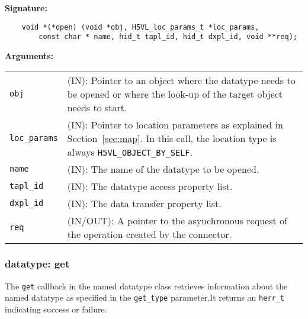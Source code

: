 \begin{mdframed}[style=bgbox]
\textbf{Signature:}
\begin{lstlisting}
    void *(*open) (void *obj, H5VL_loc_params_t *loc_params, 
        const char * name, hid_t tapl_id, hid_t dxpl_id, void **req);
\end{lstlisting}

\textbf{Arguments:}\\
\begin{tabular}{l p{13.5cm}}
  \texttt{obj} & (IN): Pointer to an object where the datatype needs
  to be opened or where the look-up of the target object needs to
  start.\\
  \texttt{loc\_params} & (IN): Pointer to location parameters as explained in
  Section~\ref{sec:map}. In this call, the location type is always \texttt{H5VL\_OBJECT\_BY\_SELF}. \\
  \texttt{name} & (IN): The name of the datatype to be opened.\\
  \texttt{tapl\_id} & (IN): The datatype access property list.\\
  \texttt{dxpl\_id} & (IN): The data transfer property list.\\
  \texttt{req} & (IN/OUT): A pointer to the asynchronous request of the
  operation created by the connector.\\
\end{tabular}
\end{mdframed}

\subsubsection{datatype: get}
The \texttt{get} callback in the named datatype class retrieves
information about the named datatype as specified in the \texttt{get\_type}
parameter.It returns an \texttt{herr\_t} indicating success or failure.\bigskip

